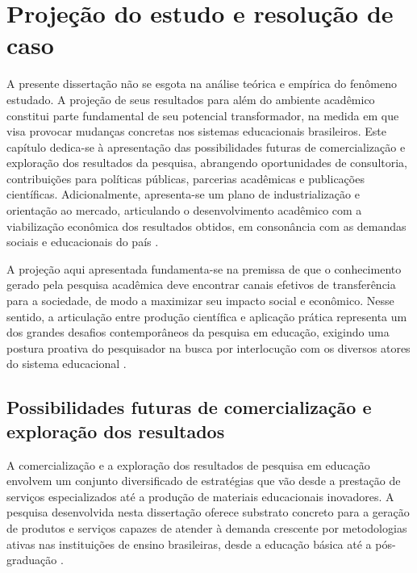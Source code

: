 
\chapter{Projeção do estudo e resolução de caso}
\label{chap:projecao_estudo}

A presente dissertação não se esgota na análise teórica e empírica do fenômeno estudado. A projeção de seus resultados para além do ambiente acadêmico constitui parte fundamental de seu potencial transformador, na medida em que visa provocar mudanças concretas nos sistemas educacionais brasileiros. Este capítulo dedica-se à apresentação das possibilidades futuras de comercialização e exploração dos resultados da pesquisa, abrangendo oportunidades de consultoria, contribuições para políticas públicas, parcerias acadêmicas e publicações científicas. Adicionalmente, apresenta-se um plano de industrialização e orientação ao mercado, articulando o desenvolvimento acadêmico com a viabilização econômica dos resultados obtidos, em consonância com as demandas sociais e educacionais do país \cite{BACICH2018}.

A projeção aqui apresentada fundamenta-se na premissa de que o conhecimento gerado pela pesquisa acadêmica deve encontrar canais efetivos de transferência para a sociedade, de modo a maximizar seu impacto social e econômico. Nesse sentido, a articulação entre produção científica e aplicação prática representa um dos grandes desafios contemporâneos da pesquisa em educação, exigindo uma postura proativa do pesquisador na busca por interlocução com os diversos atores do sistema educacional \cite{LIBANEO2006}.

\section{Possibilidades futuras de comercialização e exploração dos resultados}
\label{sec:comercializacao_resultados}

A comercialização e a exploração dos resultados de pesquisa em educação envolvem um conjunto diversificado de estratégias que vão desde a prestação de serviços especializados até a produção de materiais educacionais inovadores. A pesquisa desenvolvida nesta dissertação oferece substrato concreto para a geração de produtos e serviços capazes de atender à demanda crescente por metodologias ativas nas instituições de ensino brasileiras, desde a educação básica até a pós-graduação \cite{MUNHOZ2015}.

